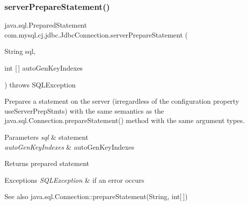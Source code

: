 \mbox{\label{interfacecom_1_1mysql_1_1cj_1_1jdbc_1_1_jdbc_connection_aefdad3d71436ba1c80d2cb1e8419dfba}} 
\subsubsection{\texorpdfstring{server\+Prepare\+Statement()}{serverPrepareStatement()}\hspace{0.1cm}{\footnotesize\ttfamily [5/6]}}
{\footnotesize\ttfamily java.\+sql.\+Prepared\+Statement com.\+mysql.\+cj.\+jdbc.\+Jdbc\+Connection.\+server\+Prepare\+Statement (\begin{DoxyParamCaption}\item[{String}]{sql,  }\item[{int \mbox{[}$\,$\mbox{]}}]{auto\+Gen\+Key\+Indexes }\end{DoxyParamCaption}) throws S\+Q\+L\+Exception}

Prepares a statement on the server (irregardless of the configuration property \textquotesingle{}use\+Server\+Prep\+Stmts\textquotesingle{}) with the same semantics as the java.\+sql.\+Connection.\+prepare\+Statement() method with the same argument types.


\begin{DoxyParams}{Parameters}
{\em sql} & statement \\
\hline
{\em auto\+Gen\+Key\+Indexes} & auto\+Gen\+Key\+Indexes \\
\hline
\end{DoxyParams}
\begin{DoxyReturn}{Returns}
prepared statement 
\end{DoxyReturn}

\begin{DoxyExceptions}{Exceptions}
{\em S\+Q\+L\+Exception} & if an error occurs \\
\hline
\end{DoxyExceptions}
\begin{DoxySeeAlso}{See also}
java.\+sql.\+Connection\+::prepare\+Statement(\+String, int\mbox{[}$\,$\mbox{]}) 
\end{DoxySeeAlso}


